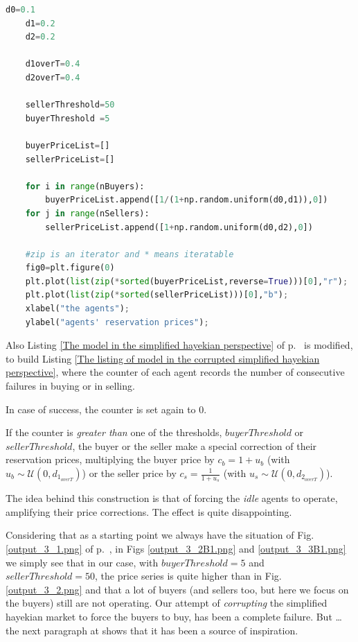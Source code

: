 \documentclass[10pt]{report}
\begin{document}
\begin{appendices}
\begin{lstlisting}[language=Python, caption=Warming up for the corrupted version of the model, 
label={Warming up for the corrupted version},basicstyle=\ttfamily\footnotesize]
    d0=0.1
    d1=0.2
    d2=0.2
    
    d1overT=0.4
    d2overT=0.4

    sellerThreshold=50
    buyerThreshold =5

    buyerPriceList=[]
    sellerPriceList=[]

    for i in range(nBuyers):
        buyerPriceList.append([1/(1+np.random.uniform(d0,d1)),0])
    for j in range(nSellers):
        sellerPriceList.append([1+np.random.uniform(d0,d2),0])
    
    #zip is an iterator and * means iteratable    
    fig0=plt.figure(0)
    plt.plot(list(zip(*sorted(buyerPriceList,reverse=True)))[0],"r");
    plt.plot(list(zip(*sorted(sellerPriceList)))[0],"b");
    xlabel("the agents");
    ylabel("agents' reservation prices");
\end{lstlisting}


Also Listing \ref{The model in the simplified hayekian perspective} of p.~\pageref{The model in the simplified hayekian perspective} is modified, to build Listing \ref{The listing of model in the corrupted simplified hayekian perspective}, where the counter of each agent records the number of consecutive failures in buying or in selling.

In case of success, the counter is set again to $0$.

If the counter is \emph{greater than}  one of the thresholds, $buyerThreshold$ or $sellerThreshold$, the buyer or the seller make a special correction of their reservation prices, multiplying the buyer price by $c_b=1 + u_b$ (with $u_b\sim\mathcal{U}(0,d_{1_{overT}})$) or the seller price by $c_s=\frac{1} {1 + u_s}$ (with $u_s\sim\mathcal{U}(0,d_{2_{overT}})$).

The idea behind this construction is that of forcing the \emph{idle} agents to operate, amplifying their price corrections. The effect is quite disappointing.

Considering that as a starting point we always have the situation of Fig. \ref{output_3_1.png} of p.~\pageref{output_3_1.png}, in Figs \ref{output_3_2B1.png} and \ref{output_3_3B1.png} we simply see that in our case, with $buyerThreshold=5$ and  $sellerThreshold=50$, the price series is quite higher than in Fig. \ref{output_3_2.png} and that a lot of buyers (and sellers too, but here we focus on the buyers) still are not operating. Our attempt of \emph{corrupting} the simplified hayekian market to force the buyers to buy, has been a complete failure. But \ldots the next paragraph at \pageref{inspiration} shows that it has been a source of inspiration.





\end{appendices}
\end{document}
